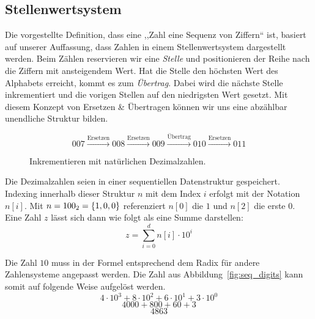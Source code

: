 \subsection{Stellenwertsystem}
%
Die vorgestellte Definition, dass eine ,,Zahl eine Sequenz von Ziffern`` ist,
basiert auf unserer Auffassung, dass Zahlen in einem Stellenwertsystem
dargestellt werden. Beim Zählen reservieren wir eine \emph{Stelle} und
positionieren der Reihe nach die Ziffern mit ansteigendem Wert.
Hat die Stelle den höchsten Wert des Alphabets erreicht,
kommt es zum \emph{Übertrag}. Dabei wird die nächste Stelle inkrementiert
und die vorigen Stellen auf den niedrigsten Wert gesetzt.
Mit diesem Konzept von Ersetzen \& Übertragen
können wir uns eine abzählbar unendliche Struktur bilden.
%
\begin{figure}[ht]
  \begin{displaymath}
    007 \xrightarrow{\text{Ersetzen}} 008 \xrightarrow{\text{Ersetzen}}
    009 \xrightarrow{\text{Übertrag}} 010 \xrightarrow{\text{Ersetzen}}
    011
  \end{displaymath}

  \caption{Inkrementieren mit natürlichen Dezimalzahlen.}
\end{figure}

Die Dezimalzahlen seien in einer sequentiellen Datenstruktur gespeichert.
Indexing innerhalb dieser Struktur $n$ mit dem Index $i$ erfolgt mit der Notation
$n[i]$. Mit $n = 100_2 = \left\{1, 0, 0\right\}$ referenziert $n[0]$ die $1$ und
$n[2]$ die erste $0$. Eine Zahl $z$ lässt sich dann wie folgt als eine Summe
darstellen:
\[
  z = \sum_{i=0}^d n[i] \cdot 10^i
\]

Die Zahl $10$ muss in der Formel entsprechend dem Radix für andere
Zahlensysteme angepasst werden. Die Zahl aus Abbildung~\ref{fig:seq_digits}
kann somit auf folgende Weise aufgelöst werden.
\[
  4\cdot10^3 + 8\cdot10^2 + 6\cdot10^1 + 3\cdot10^0
\] \[
  4000 + 800 + 60 + 3
\] \[
  4863
\]

